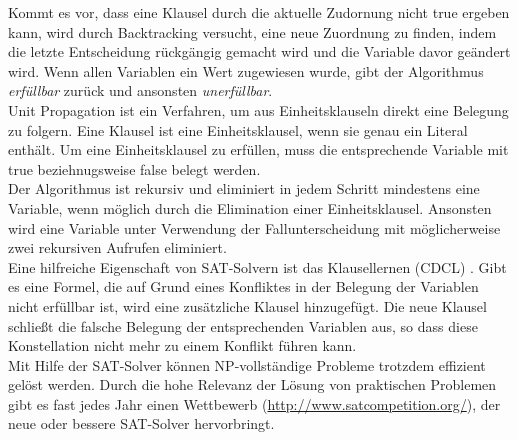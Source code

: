 \documentclass[a4,abstract=on]{scrartcl}
\begin{document}
Kommt es vor, dass eine Klausel durch die aktuelle Zudornung nicht true ergeben kann, wird durch Backtracking versucht, eine neue Zuordnung zu finden, indem die letzte Entscheidung rückgängig gemacht wird und die Variable davor geändert wird. 
Wenn allen Variablen ein Wert zugewiesen wurde, gibt der Algorithmus \emph{erfüllbar} zurück und ansonsten \emph{unerfüllbar}.\\
Unit Propagation ist ein Verfahren, um aus Einheitsklauseln direkt eine Belegung zu folgern. Eine Klausel ist eine Einheitsklausel, wenn sie genau ein Literal enthält. Um eine Einheitsklausel zu erfüllen, muss die entsprechende Variable mit true beziehnugsweise false belegt werden.\\
Der Algorithmus ist rekursiv und eliminiert in jedem Schritt mindestens eine Variable, wenn möglich durch die Elimination einer Einheitsklausel. Ansonsten wird eine Variable unter Verwendung der Fallunterscheidung mit möglicherweise zwei rekursiven Aufrufen eliminiert.\\
Eine hilfreiche Eigenschaft von SAT-Solvern ist das Klausellernen (CDCL) \cite[][]{cdcl}. Gibt es eine Formel, die auf Grund eines Konfliktes in der Belegung der Variablen nicht erfüllbar ist, wird eine zusätzliche Klausel hinzugefügt. Die neue Klausel schließt die falsche Belegung der entsprechenden Variablen aus, so dass diese Konstellation nicht mehr zu einem Konflikt führen kann.\\
Mit Hilfe der SAT-Solver können NP-vollständige Probleme trotzdem effizient gelöst werden. Durch die hohe Relevanz der Lösung von praktischen Problemen gibt es fast jedes Jahr einen Wettbewerb (\url{http://www.satcompetition.org/}), der neue oder bessere SAT-Solver hervorbringt.

\end{document}
